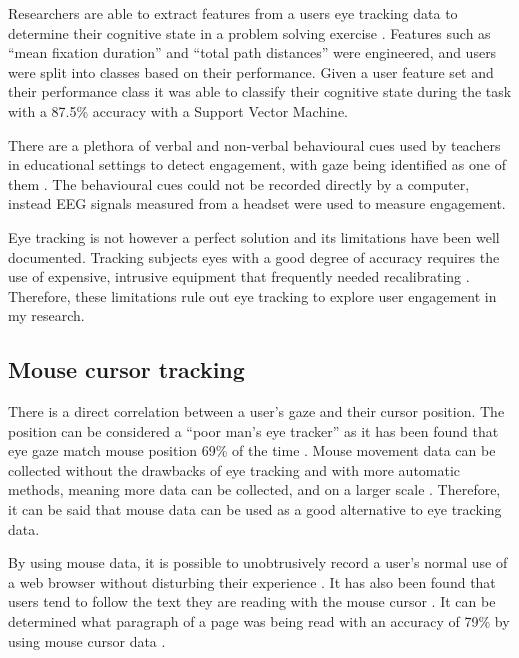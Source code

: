 \documentclass{article}
\begin{document}
Researchers are able to extract features from a users eye tracking data to determine their cognitive state in a problem solving exercise \cite{eivazi2011predicting}.
Features such as ``mean fixation duration'' and ``total path distances'' were engineered, and users were split into classes based on their performance. 
Given a user feature set and their performance class it was able to classify their cognitive state during the task with a 87.5\% accuracy with a Support Vector Machine.

There are a plethora of verbal and non-verbal behavioural cues used by teachers in educational settings to detect engagement, with gaze being identified as one of them \cite{szafir2012pay}.
The behavioural cues could not be recorded directly by a computer, instead EEG signals measured from a headset were used to measure engagement.

Eye tracking is not however a perfect solution and its limitations have been well documented. 
Tracking subjects eyes with a good degree of accuracy requires the use of expensive, intrusive equipment that frequently needed recalibrating \cite{richardson2004eye}. 
Therefore, these limitations rule out eye tracking to explore user engagement in my research.

\subsection{Mouse cursor tracking}

There is a direct correlation between a user’s gaze and their cursor position. 
The position can be considered a ``poor man’s eye tracker'' as it has been found that eye gaze match mouse position 69\% of the time \cite{cooke2006mouse}. 
Mouse movement data can be collected without the drawbacks of eye tracking and with more automatic methods, meaning more data can be collected, and on a larger scale \cite{demvsar2017quantifying}.
Therefore, it can be said that mouse data can be used as a good alternative to eye tracking data.

By using mouse data, it is possible to unobtrusively record a user’s normal use of a web browser without disturbing their experience \cite{goecks2000learning}.
It has also been found that users tend to follow the text they are reading with the mouse cursor \cite{liu2007detecting}. 
It can be determined what paragraph of a page was being read with an accuracy of 79\% by using mouse cursor data \cite{hauger2011using}. 
\end{document}
